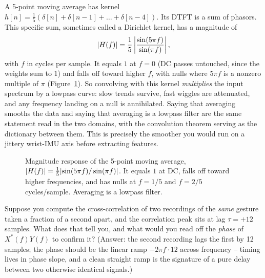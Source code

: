 \begin{example}
\label{ch11:ex-smoothing}
A 5-point moving average has kernel
$h[n] = \tfrac15(\delta[n] + \delta[n{-}1] + \dots + \delta[n{-}4])$. Its DTFT is a sum of phasors. This specific sum, sometimes called a Dirichlet kernel, has a magnitude of
\[
\lvert H(f)\rvert = \frac{1}{5}\left|\frac{\sin(5\pi f)}{\sin(\pi f)}\right|,
\]
with $f$ in cycles per sample. It equals $1$ at $f = 0$ (DC passes untouched,
since the weights sum to $1$) and falls off toward higher $f$, with nulls where
$5\pi f$ is a nonzero multiple of $\pi$ (Figure~\ref{ch11:fig-movavg}). So convolving with this kernel
\emph{multiplies} the input spectrum by a lowpass curve: slow trends survive,
fast wiggles are attenuated, and any frequency landing on a null is
annihilated. Saying that averaging smooths the data and saying that averaging is a lowpass filter
are the same statement read in the two domains, with the convolution theorem serving as
the dictionary between them. This is precisely the smoother you would run on a
jittery wrist-IMU axis before extracting features.
\end{example}

\begin{figure}[H]
\centering
{}
\caption{Magnitude response of the 5-point moving average,
$\lvert H(f)\rvert = \tfrac15\lvert\sin(5\pi f)/\sin(\pi f)\rvert$. It equals $1$ at DC,
falls off toward higher frequencies, and has nulls at $f = 1/5$ and $f = 2/5$
cycles/sample. Averaging is a lowpass filter.}
\label{ch11:fig-movavg}
\end{figure}

\begin{walkbox}
Suppose you compute the cross-correlation of two recordings of the \emph{same}
gesture taken a fraction of a second apart, and the correlation peak sits at lag
$\tau = +12$ samples. What does that tell you, and what would you read off the
\emph{phase} of $X^{*}(f)Y(f)$ to confirm it? (Answer: the second recording lags
the first by 12 samples; the phase should be the linear ramp $-2\pi f \cdot 12$
across frequency -- timing lives in phase slope, and a clean straight ramp is the
signature of a pure delay between two otherwise identical signals.)
\end{walkbox}

